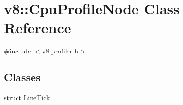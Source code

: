 \hypertarget{classv8_1_1_cpu_profile_node}{}\section{v8\+:\+:Cpu\+Profile\+Node Class Reference}
\label{classv8_1_1_cpu_profile_node}


{\ttfamily \#include $<$v8-\/profiler.\+h$>$}

\subsection*{Classes}
\begin{DoxyCompactItemize}
\item 
struct \hyperlink{structv8_1_1_cpu_profile_node_1_1_line_tick}{Line\+Tick}
\end{DoxyCompactItemize}
